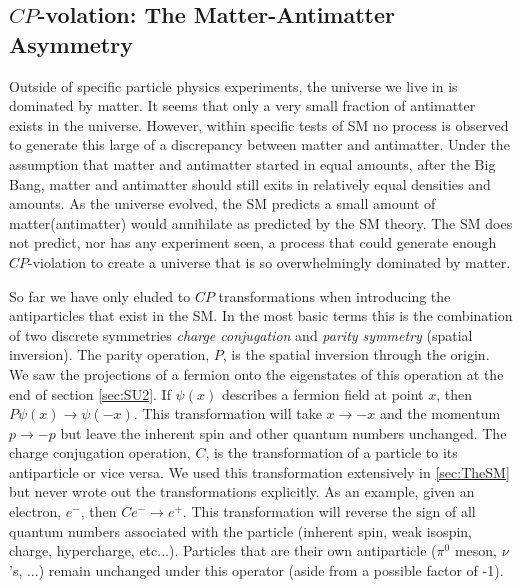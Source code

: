 \subsection{$CP$-volation: The Matter-Antimatter Asymmetry}
\label{sec:CPviolation}

Outside of specific particle physics experiments, the universe we live in is dominated by matter. It seems that only a very small fraction of antimatter exists in the universe. However, within specific tests of SM no process is observed to generate this large of a discrepancy between matter and antimatter. Under the assumption that matter and antimatter started in equal amounts, after the Big Bang, matter and antimatter should still exits in relatively equal densities and amounts. As the universe evolved, the SM predicts a small amount of matter(antimatter) would annihilate as predicted by the SM theory. The SM does not predict, nor has any experiment seen, a process that could generate enough $CP$-violation to create a universe that is so overwhelmingly dominated by matter.

So far we have only eluded to $CP$ transformations when introducing the antiparticles that exist in the SM. In the most basic terms this is the combination of two discrete symmetries \textit{charge conjugation} and \textit{parity symmetry} (spatial inversion). The parity operation, $P$, is the spatial inversion through the origin. We saw the projections of a fermion onto the eigenstates of this operation at the end of section \ref{sec:SU2}. If $\psi\left(x\right)$ describes a fermion field at point $x$, then $P\psi\left(x\right) \to \psi\left(-x\right)$. This transformation will take $x \to -x$ and the momentum $p \to -p$ but leave the inherent spin and other quantum numbers unchanged. The charge conjugation operation, $C$, is the transformation of a particle to its antiparticle or vice versa. We used this transformation extensively in \ref{sec:TheSM} but never wrote out the transformations explicitly. As an example, given an electron, $e^{-}$, then $Ce^{-} \to e^{+}$. This transformation will reverse the sign of all quantum numbers associated with the particle (inherent spin, weak isospin, charge, hypercharge, etc...). Particles that are their own antiparticle ($\pi^0$ meson, $\nu$'s, ...) remain unchanged under this operator (aside from a possible factor of -1).

